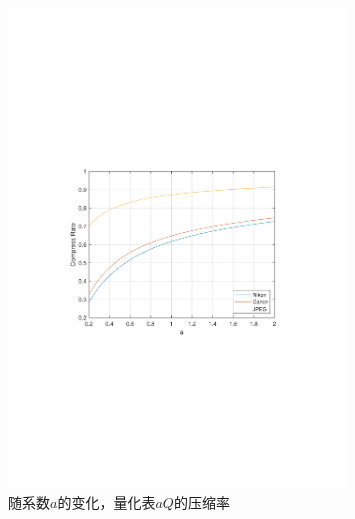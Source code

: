 \documentclass[12pt,a4paper]{article}
\begin{document}
\begin{figure}[H]
    \centering
    \includegraphics[width=0.8\textwidth,trim={3.09cm 9.295cm 3.09cm 9.295cm},clip]{../output/quant_factor_compress.pdf}
    \caption{随系数$a$的变化，量化表$aQ$的压缩率}
    \label{fig:quant_factor_compress}
\end{figure}
\end{document}
